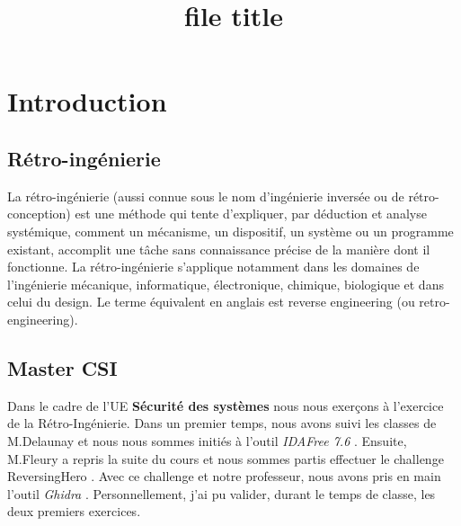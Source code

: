 \documentclass{rapport}
\title{file title} %
\begin{document}

\subject{Reverse} %



        
\buildmargins %
\buildcover %
\toc %


\section{Introduction}
\subsection{Rétro-ingénierie}

\hspace{18pt}La rétro-ingénierie (aussi connue sous le nom d'ingénierie inversée ou de rétro-conception) est une méthode qui tente d'expliquer, par déduction et analyse systémique, comment un mécanisme, un dispositif, un système ou un programme existant, accomplit une tâche sans connaissance précise de la manière dont il fonctionne. La rétro-ingénierie s'applique notamment dans les domaines de l'ingénierie mécanique, informatique, électronique, chimique, biologique et dans celui du design. Le terme équivalent en anglais est reverse engineering (ou retro-engineering). \cite{retroIngenieury}

\subsection{Master CSI}

\hspace{18pt}Dans le cadre de l'UE \textbf{Sécurité des systèmes} nous nous exerçons à l'exercice de la Rétro-Ingénierie. Dans un premier temps, nous avons suivi les classes de M.Delaunay et nous nous sommes initiés à l'outil \textit{IDAFree 7.6} \cite{idafree}. Ensuite, M.Fleury a repris la suite du cours et nous sommes partis effectuer le challenge ReversingHero \cite{reversingHero}. Avec ce challenge et notre professeur, nous avons pris en main l'outil \textit{Ghidra} \cite{ghidra}. Personnellement, j'ai pu valider, durant le temps de classe, les deux premiers exercices.\medbreak
\end{document}
